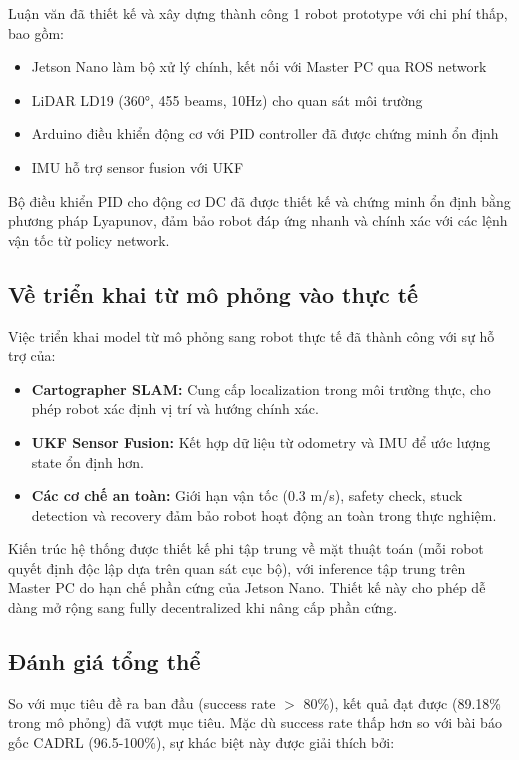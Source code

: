 Luận văn đã thiết kế và xây dựng thành công 1 robot prototype với chi phí thấp, bao gồm:

\begin{itemize}[nosep]
\item Jetson Nano làm bộ xử lý chính, kết nối với Master PC qua ROS network
\item LiDAR LD19 (360°, 455 beams, 10Hz) cho quan sát môi trường
\item Arduino điều khiển động cơ với PID controller đã được chứng minh ổn định
\item IMU hỗ trợ sensor fusion với UKF
\end{itemize}

Bộ điều khiển PID cho động cơ DC đã được thiết kế và chứng minh ổn định bằng phương pháp Lyapunov, đảm bảo robot đáp ứng nhanh và chính xác với các lệnh vận tốc từ policy network.

\subsection{Về triển khai từ mô phỏng vào thực tế}

Việc triển khai model từ mô phỏng sang robot thực tế đã thành công với sự hỗ trợ của:

\begin{itemize}[nosep]
\item \textbf{Cartographer SLAM:} Cung cấp localization trong môi trường thực, cho phép robot xác định vị trí và hướng chính xác.
\item \textbf{UKF Sensor Fusion:} Kết hợp dữ liệu từ odometry và IMU để ước lượng state ổn định hơn.
\item \textbf{Các cơ chế an toàn:} Giới hạn vận tốc (0.3 m/s), safety check, stuck detection và recovery đảm bảo robot hoạt động an toàn trong thực nghiệm.
\end{itemize}

Kiến trúc hệ thống được thiết kế phi tập trung về mặt thuật toán (mỗi robot quyết định độc lập dựa trên quan sát cục bộ), với inference tập trung trên Master PC do hạn chế phần cứng của Jetson Nano. Thiết kế này cho phép dễ dàng mở rộng sang fully decentralized khi nâng cấp phần cứng.

\subsection{Đánh giá tổng thể}

So với mục tiêu đề ra ban đầu (success rate $>$ 80\%), kết quả đạt được (89.18\% trong mô phỏng) đã vượt mục tiêu. Mặc dù success rate thấp hơn so với bài báo gốc CADRL (96.5-100\%), sự khác biệt này được giải thích bởi:

